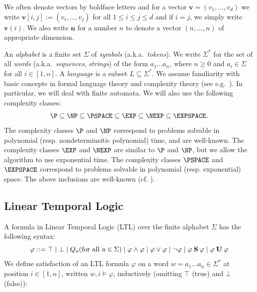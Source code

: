 We often denote vectors by boldface letters and for a vector $\bm v = (v_1,\dots,v_d)$ we write $\bm v[i,j] := (v_i,\dots,v_j)$
for all $1 \le i \le j \le d$ and if $i=j$, we simply write $\bm v(i)$.
We also write $\bm n$ for a number $n$ to denote a vector $(n,\dots,n)$ of appropriate dimension.

An \emph{alphabet} is a finite set $\Sigma$ of \emph{symbols} (a.k.a.\ \emph{tokens}).
We write $\Sigma^*$ for the set of all \emph{words} (a.k.a.\ \emph{sequences}, \emph{strings}) of the form 
$a_1\dots a_n$, where $n \ge 0$ and $a_i \in \Sigma$ for all $i \in [1,n]$.
A \emph{language} is a subset $L \subseteq \Sigma^*$.
We assume familiarity with basic concepts in formal language theory and
complexity theory (see e.g.\ \citep{Kozen,Sipser97}). In particular, we will 
deal with finite automata. We will also use the following complexity classes:
\[
    \P \subseteq \NP \subseteq \PSPACE \subseteq \EXP \subseteq \NEXP \subseteq 
\EXPSPACE.
\]
The complexity classes $\P$ and $\NP$ correspond to problems solvable in
polynomial (resp. nondeterminsitic polynomial) time, and are well-known.
The complexity classes $\EXP$ and $\NEXP$ are similar to $\P$ and $\NP$, but
we allow the algorithm to use exponential time. The complexity classes 
$\PSPACE$ and $\EXPSPACE$ correspond to problems solvable
in polynomial (resp. exponential) space. The above inclusions are well-known
(cf. \citep{Sipser97}).


\subsection{Linear Temporal Logic}
A formula in Linear Temporal Logic (LTL) over the finite alphabet $\Sigma$ has the following syntax:
\[\varphi ::= \top \mid \bot \mid  Q_a (\text{for all } a \in \Sigma) \mid 
\varphi \wedge \varphi \mid \varphi \vee \varphi \mid \neg\varphi \mid
\varphi \mathbin{\textbf{S}} \varphi \mid \varphi \mathbin{\textbf{U}} \varphi\] 
We define satisfaction of an LTL formula $\varphi$ on a word $w = a_1\dots a_n \in \Sigma^*$ at position $i \in [1,n]$,
written $w,i \models \varphi$, inductively (omitting $\top$ (true) and $\bot$ (false)):

